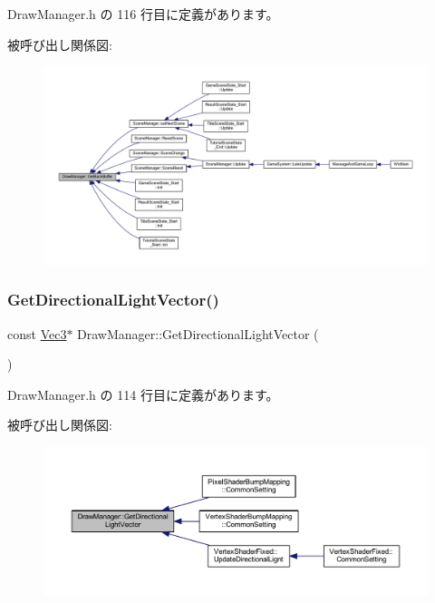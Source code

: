  Draw\+Manager.\+h の 116 行目に定義があります。

被呼び出し関係図\+:
\nopagebreak
\begin{figure}[H]
\begin{center}
\leavevmode
\includegraphics[width=350pt]{class_draw_manager_a0e7e11e650f1c1736e9d3199a58191a7_icgraph}
\end{center}
\end{figure}
\mbox{\label{class_draw_manager_a952023ad9e2e12844c93e37029a32700}} 
\subsubsection{\texorpdfstring{Get\+Directional\+Light\+Vector()}{GetDirectionalLightVector()}}
{\footnotesize\ttfamily const \mbox{\hyperlink{_vector3_d_8h_ab16f59e4393f29a01ec8b9bbbabbe65d}{Vec3}}$\ast$ Draw\+Manager\+::\+Get\+Directional\+Light\+Vector (\begin{DoxyParamCaption}{ }\end{DoxyParamCaption})\hspace{0.3cm}{\ttfamily [inline]}}



 Draw\+Manager.\+h の 114 行目に定義があります。

被呼び出し関係図\+:\nopagebreak
\begin{figure}[H]
\begin{center}
\leavevmode
\includegraphics[width=350pt]{class_draw_manager_a952023ad9e2e12844c93e37029a32700_icgraph}
\end{center}
\end{figure}
\mbox{\label{class_draw_manager_a3cb9319d492285bd9dfc983d27e5d04f}} 
